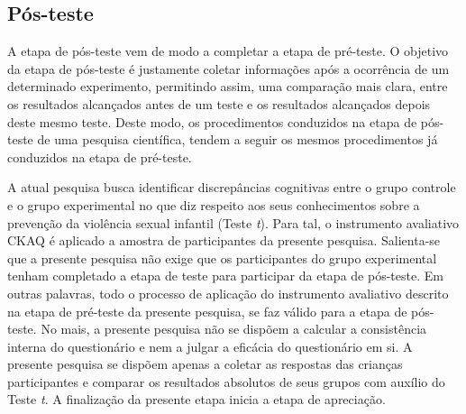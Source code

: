 \subsection{Pós-teste}\label{subsec:posteste}

A etapa de pós-teste vem de modo a completar a etapa de pré-teste. O objetivo da etapa de pós-teste é justamente coletar informações após a ocorrência de um determinado experimento, permitindo assim, uma comparação mais clara, entre os resultados alcançados antes de um teste e os resultados alcançados depois deste mesmo teste. Deste modo, os procedimentos conduzidos na etapa de pós-teste de uma pesquisa científica, tendem a seguir os mesmos procedimentos já conduzidos na etapa de pré-teste. 

A atual pesquisa busca identificar discrepâncias cognitivas entre o grupo controle e o grupo experimental no que diz respeito aos seus conhecimentos sobre a prevenção da violência sexual infantil (Teste \textit{t}). Para tal, o instrumento avaliativo \ac{CKAQ} é aplicado a amostra de participantes da presente pesquisa. Salienta-se que a presente pesquisa não exige que os participantes do grupo experimental tenham completado a etapa de teste para participar da etapa de pós-teste. Em outras palavras, todo o processo de aplicação do instrumento avaliativo descrito na etapa de pré-teste da presente pesquisa, se faz válido para a etapa de pós-teste. No mais, a presente pesquisa não se dispõem a calcular a consistência interna do questionário e nem a julgar a eficácia do questionário em si. A presente pesquisa se dispõem apenas a coletar as respostas das crianças participantes e comparar os resultados absolutos de seus grupos com auxílio do Teste \textit{t}. A finalização da presente etapa inicia a etapa de apreciação.



